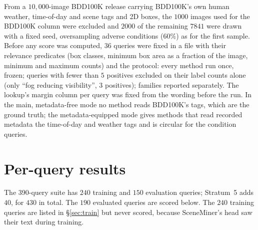 \documentclass[10pt,letterpaper]{article}
\begin{document}
From a $10{,}000$-image BDD100K release carrying BDD100K's own human weather,
time-of-day and scene tags and 2D boxes, the $1000$ images used for the BDD100K
column were excluded and $2000$ of the remaining $7841$ were drawn with a fixed
seed, oversampling adverse conditions ($60\%$) as for the first sample. Before any
score was computed, $36$ queries were fixed in a file with their relevance
predicates (box classes, minimum box area as a fraction of the image, minimum and
maximum counts) and the protocol: every method run once, frozen; queries with fewer
than $5$ positives excluded on their label counts alone (only ``fog reducing
visibility'', $3$ positives); families reported separately. The lookup's margin
column per query was fixed from the wording before the run. In the main,
metadata-free mode no method reads BDD100K's tags, which are the ground truth; the
metadata-equipped mode gives methods that read recorded metadata the time-of-day and
weather tags and is circular for the condition queries.

\begin{table}[!ht]\centering\small
\caption{\textbf{Untouched BDD100K holdout}, $2000$ images, $35$ queries: (a)
condition, (b) object (graded by human 2D boxes), (c) object$\times$condition.
$\Delta$: method minus SceneMiner, per-query sign-flip permutation $p$.}
\label{tab:holdout}
\resizebox{\textwidth}{!}{}
\end{table}

\section{Per-query results}

The 390-query suite has $240$ training and $150$ evaluation queries; Stratum~5
adds $40$, for $430$ in total. The $190$ evaluated queries are scored below. The
$240$ training queries are listed in \S\ref{sec:train} but never scored, because
SceneMiner's head saw their text during training.

\begin{table}[!ht]\centering\small
\caption{\textbf{BDD100K per query.} I/O: in-/out-of-vocabulary by wording;
$\gamma_{\mathrm{deg}}$: concept specificity; column: margin column the gate aligns to (inactive
when $\gamma_{\mathrm{deg}}\approx0$).}
\label{tab:bddq}

\end{table}
\end{document}
